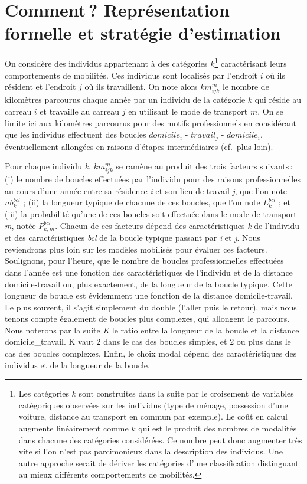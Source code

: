 \documentclass[
  9pt,
  a4paper,
  DIV=11]{scrreprt}
\begin{document}
\section{Comment\,? Représentation formelle et stratégie
d'estimation}\label{comment-repruxe9sentation-formelle-et-stratuxe9gie-destimation}

On considère des individus appartenant à des catégories \(k\)\footnote{Les
  catégories \(k\) sont construites dans la suite par le croisement de
  variables catégoriques observées sur les individus (type de ménage,
  possession d'une voiture, distance au transport en commun par
  exemple). Le coût en calcul augmente linéairement comme \(k\) qui est
  le produit des nombres de modalités dans chacune des catégories
  considérées. Ce nombre peut donc augmenter très vite si l'on n'est pas
  parcimonieux dans la description des individus. Une autre approche
  serait de dériver les catégories d'une classification distinguant au
  mieux différents comportements de mobilités.} caractérisant leurs
comportements de mobilités. Ces individus sont localisés par l'endroit
\(i\) où ils résident et l'endroit \(j\) où ils travaillent. On note
alors \(km^m_{ijk}\) le nombre de kilomètres parcourus chaque année par
un individu de la catégorie \(k\) qui réside au carreau \(i\) et
travaille au carreau \(j\) en utilisant le mode de transport \(m\). On
se limite ici aux kilomètres parcourus pour des motifs professionnels en
considérant que les individus effectuent des boucles \(domicile_i\) -
\(travail_j\) - \(domicile_i\), éventuellement allongées en raisons
d'étapes intermédiaires (cf.~plus loin).

Pour chaque individu \emph{k}, \(km^m_{ijk}\) se ramène au produit des
trois facteurs suivants\,: (i) le nombre de boucles effectuées par
l'individu pour des raisons professionnelles au cours d'une année entre
sa résidence \emph{i} et son lieu de travail \emph{j}, que l'on note
\(nb^{bcl}_k\) ; (ii) la longueur typique de chacune de ces boucles, que
l'on note \(L^{bcl}_k\) ; et (iii) la probabilité qu'une de ces boucles
soit effectuée dans le mode de transport \emph{m}, notée
\(P^{bcl}_{k,m}\). Chacun de ces facteurs dépend des caractéristiques
\emph{k} de l'individu et des caractéristiques \emph{bcl} de la boucle
typique passant par \emph{i} et \emph{j}. Nous reviendrons plus loin sur
les modèles mobilisés pour évaluer ces facteurs. Soulignons, pour
l'heure, que le nombre de boucles professionnelles effectuées dans
l'année est une fonction des caractéristiques de l'individu et de la
distance domicile-travail ou, plus exactement, de la longueur de la
boucle typique. Cette longueur de boucle est évidemment une fonction de
la distance domicile-travail. Le plus souvent, il s'agit simplement du
double (l'aller puis le retour), mais nous tenons compte également de
boucles plus complexes, qui allongent le parcours. Nous noterons par la
suite \emph{K} le ratio entre la longueur de la boucle et la distance
domicile\_travail. K vaut 2 dans le cas des boucles simples, et 2 ou
plus dans le cas des boucles complexes. Enfin, le choix modal dépend des
caractéristiques des individus et de la longueur de la boucle.
\end{document}
